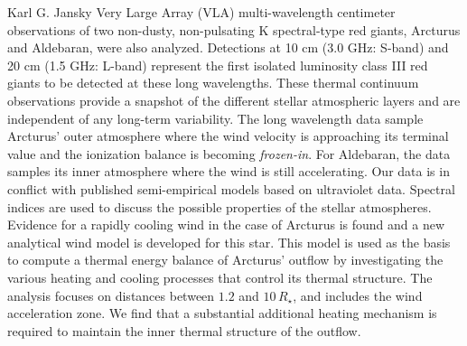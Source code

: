 \begin{abstracts}
Karl G. Jansky Very Large Array (VLA) multi-wavelength centimeter observations of two non-dusty, non-pulsating K spectral-type red giants, Arcturus and Aldebaran, were also analyzed. Detections at 10 cm (3.0 GHz: S-band) and 20 cm (1.5 GHz: L-band) represent the first isolated luminosity class III red giants to be detected at these long wavelengths. These thermal continuum observations provide  a snapshot of the different stellar atmospheric layers and are independent of any long-term variability. The long wavelength data sample Arcturus' outer atmosphere where the wind velocity is approaching its terminal value and the ionization balance is becoming \textit{frozen-in}. For Aldebaran, the data samples its inner atmosphere where the wind is still accelerating. Our data is in conflict with published semi-empirical models based on ultraviolet data. Spectral indices are used to discuss the possible properties of the stellar atmospheres. Evidence for a rapidly cooling wind in the case of Arcturus is found and a new analytical wind model is developed for this star. This model is used as the basis to compute a thermal energy balance of Arcturus' outflow by investigating the various heating and cooling processes that control its thermal structure. The analysis focuses on distances between $1.2$ and $10\,R_{\star}$, and includes the wind acceleration zone. We find that a substantial additional heating mechanism is required to maintain the inner thermal structure of the outflow.

\end{abstracts}

